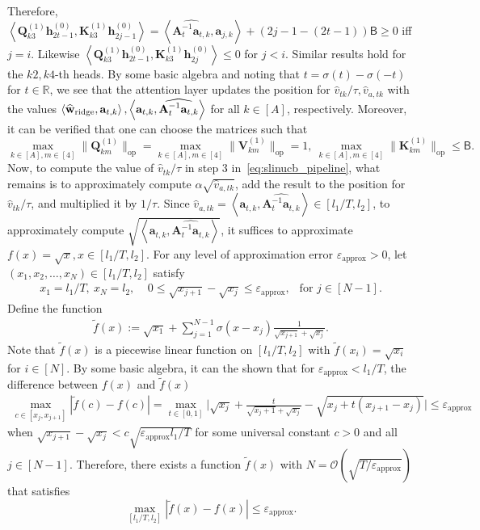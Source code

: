 \documentclass[10pt]{article}
\renewcommand{\hat}{\widehat}
\newcommand{\eps}{\varepsilon}
\newcommand{\lops}[1]{\|{#1}\|_{\mathrm{op}}}
\renewcommand{\cO}{\mathcal{O}}
\newcommand{\<}{\left\langle}
\renewcommand{\>}{\right\rangle}
\renewcommand{\bQ}{\mathbf{Q}}
\newcommand{\ridge}{{\rm ridge}}
\newcommand{\R}{\mathbb{R}}
\newcommand{\lran}{{l_1}}
\newcommand{\uran}{{l_2}}
\newcommand{\appr}{{\mathrm{approx}}}
\newcommand{\temp}{{\tau}}
\newcommand{\cwid}{{\alpha}}
\newcommand{\tfthres}{{\mathsf{B}}}
\def\bA{{\mathbf A}}
\def\bK{{\mathbf K}}
\def\bQ{{\mathbf Q}}
\def\bV{{\mathbf V}}
\def\ba{{\mathbf a}}
\def\bh{{\mathbf h}}
\def\bw{{\mathbf w}}
\begin{document}
Therefore,  $\<\bQ^{(1)}_{k3}\bh^{(0)}_{2t-1},\bK^{(1)}_{k3}\bh^{(0)}_{2j-1}\>=\<\widehat{\bA_t^{-1}\ba_{t,k}},\ba_{j,k}\>+(2j-1-(2t-1))\tfthres\geq 0$ iff $j=i$. Likewise $\<\bQ^{(1)}_{k3}\bh^{(0)}_{2t-1},\bK^{(1)}_{k3}\bh^{(0)}_{2j}\>\leq 0$  for $j<i$. Similar results hold for the $k2,k4$-th heads.  By some basic algebra and noting that $t=\sigma(t)-\sigma(-t)$ for $t\in\R$, we see that the attention layer updates the position for $\hat v_{tk}/\temp,\hat v_{a,tk}$ with the values $\<\hat\bw_{\ridge},\ba_{t,k}\>, \<\ba_{t,k},\widehat{\bA_t^{-1}\ba_{t,k}}\>$ for all $k\in[A]$, respectively.  Moreover, it can be verified that one can choose the matrices such that $$\max_{k\in[A],m\in[4]}\lops{\bQ_{km}^{(1)}}=\max_{k\in[A],m\in[4]}\lops{\bV_{km}^{(1)}}=1,~\max_{k\in[A],m\in[4]}\lops{\bK^{(1)}_{km}}\leq\tfthres.$$
Now, to compute the value of $\hat v_{tk}/\temp$ in step 3 in~\eqref{eq:slinucb_pipeline}, what remains  is to  approximately compute $\cwid\sqrt{\hat v_{a,tk}}$, add the result to the position for $\hat v_{tk}/\temp$, and multiplied it by $1/\temp$.
Since $\hat v_{a,tk}=\<\ba_{t,k},\widehat{\bA_t^{-1}\ba_{t,k}}\>\in[\lran/T,\uran]$, to approximately compute $\sqrt{\<\ba_{t,k},\widehat{\bA_t^{-1}\ba_{t,k}}\>}$, it suffices to approximate $f(x)=\sqrt{x},x\in[\lran/T,\uran]$. For any  level of approximation error $\eps_\appr>0$, let $(x_1,x_2,\ldots,x_N)\in[\lran/T,\uran]$ satisfy
\begin{align*}
x_1=\lran/T,~x_N=\uran,   ~~~~~
    0\leq\sqrt{x_{j+1}}-\sqrt{x_{j}}\leq\eps_\appr,~~\text{ for }j\in[N-1].
\end{align*}
Define the function
\begin{align*}
    \tilde f(x):=\sqrt{x_1}+\sum_{j=1}^{N-1}\sigma(x-x_{j})\frac{1}{\sqrt{x_{j+1}}+\sqrt{x_j}}.
\end{align*} Note that $\tilde f(x)$ is a piecewise linear function on $[\lran/T,\uran]$ with $\tilde f(x_i)=\sqrt{x_i}$ for $i\in[N]$. By some basic algebra,  it can the shown that for $\eps_\appr<\lran/T$, the difference between $f(x)$ and $\tilde f(x)$
\begin{align*}
   \max_{c\in[x_j,x_{j+1}]} |\tilde f(c)-f(c)|=\max_{t\in[0,1]}\Big|\sqrt{x_j}+\frac{t}{\sqrt{x_j+1}+\sqrt{x_j}}-\sqrt{x_j+t(x_{j+1}-x_j)}\Big|\leq\eps_\appr
\end{align*} when $\sqrt{x_{j+1}}-\sqrt{x_{j}}<c\sqrt{\eps_\appr\lran/T}$ for some universal constant $c>0$ and all $j\in[N-1]$.
Therefore,
 there exists a function $\tilde f(x)$ with $N=\cO(\sqrt{T/\eps_\appr})$ that satisfies $$\max_{[\lran/T,\uran]}|\tilde f(x)-f(x)|\leq\eps_\appr.$$
\end{document}
